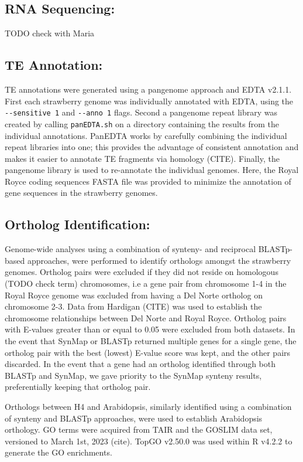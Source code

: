 \documentclass[fleqn,10pt]{olplainarticle}
\begin{document}
\subsection{RNA Sequencing:}
TODO check with Maria

\subsection{TE Annotation:}
TE annotations were generated using a pangenome approach and EDTA v2.1.1.
First each strawberry genome was individually annotated with EDTA, using the \verb|--sensitive 1| and \verb|--anno 1| flags.
Second a pangenome repeat library was created by calling \verb|panEDTA.sh| on a directory containing the results from the individual annotations.
PanEDTA works by carefully combining the individual repeat libraries into one; this provides the advantage of consistent annotation and makes it easier to annotate TE fragments via homology (CITE). 
Finally, the pangenome library is used to re-annotate the individual genomes.
Here, the Royal Royce coding sequences FASTA file was provided to minimize the annotation of gene sequences in the strawberry genomes.



\subsection{Ortholog Identification:} \label{sec:methods_orthologs}
Genome-wide analyses using a combination of synteny- and reciprocal BLASTp- based approaches, were performed to identify orthologs amongst the strawberry genomes.
Ortholog pairs were excluded if they did not reside on homologous (TODO check term) chromosomes, i.e a gene pair from chromosome 1-4 in the Royal Royce genome was excluded from having a Del Norte ortholog on chromosome 2-3.
Data from Hardigan (CITE) was used to establish the chromosome relationships between Del Norte and Royal Royce.
Ortholog pairs with E-values greater than or equal to 0.05 were excluded from both datasets.
In the event that SynMap or BLASTp returned multiple genes for a single gene, the ortholog pair with the best (lowest) E-value score was kept, and the other pairs discarded.
In the event that a gene had an ortholog identified through both BLASTp and SynMap, we gave priority to the SynMap synteny results, preferentially keeping that ortholog pair. 

Orthologs between H4 and Arabidopsis, similarly identified using a combination of synteny and BLASTp approaches, were used to establish Arabidopsis orthology.
GO terms were acquired from TAIR and the GOSLIM data set, versioned to March 1st, 2023 (cite).
TopGO v2.50.0 was used within R v4.2.2 to generate the GO enrichments.
\end{document}
